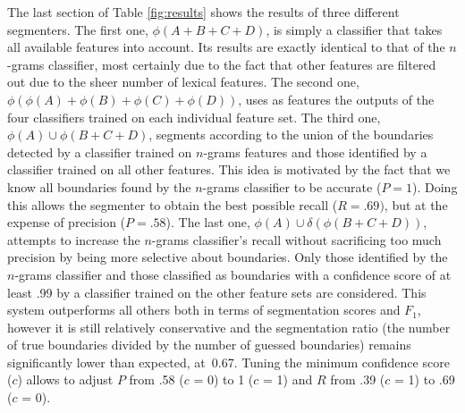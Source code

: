 The last section of Table \ref{fig:results} shows the results of three different segmenters. The first one, $\phi(A + B + C + D)$, is simply a classifier that takes all available features into account. Its results are exactly identical to that of the $n$-grams classifier, most certainly due to the fact that other features are filtered out due to the sheer number of lexical features. The second one, $\phi(\phi(A) + \phi(B) + \phi(C) + \phi(D))$, uses as features the outputs of the four classifiers trained on each individual feature set. The third one, $\phi(A) \cup \phi(B + C + D)$, segments according to the union of the boundaries detected by a classifier trained on $n$-grams features and those identified by a classifier trained on all other features. This idea is motivated by the fact that we know all boundaries found by the $n$-grams classifier to be accurate ($P=1$). Doing this allows the segmenter to obtain the best possible recall ($R=.69)$, but at the expense of precision ($P=.58$). The last one, $\phi(A) \cup \delta(\phi(B + C + D))$, attempts to increase the $n$-grams classifier's recall without sacrificing too much precision by being more selective about boundaries. Only those identified by the $n$-grams classifier and those classified as boundaries with a confidence score of at least .99 by a classifier trained on the other feature sets are considered. This system outperforms all others both in terms of segmentation scores and $F_1$, however it is still relatively conservative and the segmentation ratio (the number of true boundaries divided by the number of guessed boundaries) remains significantly lower than expected, at~0.67. Tuning the minimum confidence score ($c$) allows to adjust $P$ from .58 ($c$ = 0) to 1 ($c$ = 1) and $R$ from .39 ($c$ = 1) to .69 ($c$ = 0).
